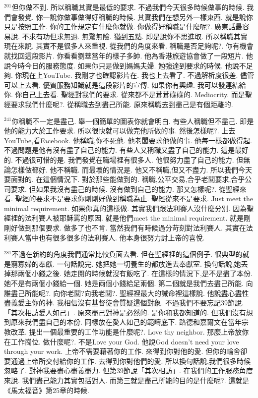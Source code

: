 \documentclass{book}
\begin{document}
$^{201}$但你做不到.
所以稱職其實是最低的要求.
不過我們今天很多時候做事的時候.
我們會發覺.
你一說你做事做得好稱職的時候.
其實我們在想另外一樣東西.
就是說你只是按照工作.
你的工作規定有什麼你就做.
你做得好稱職是什麼呢?.
廣東話最容易說.
不求有功但求無過.
無驚無險.
猶到五點.
即是說你不思進取.
所以稱職其實現在來說.
其實不是很多人來重視.
從我們的角度來看.
稱職是否足夠呢?.
你有機會就找回這段影片.
你看看劉華當年的樣子多帥.
他為香港旅遊協會做了一段短片.
他說今時今日的服務態度.
如果你只是做到媽媽夫婦.
勉強達到要求的時候.
他說不足夠.
你現在上YouTube.
我剛才也確認影片在.
我也上去看了.
不過解析度很差.
儘管可以上去看.
優質服務知識就是這段影片的宣傳.
如果你有興趣.
我可以發連結給你.
你自己上去看.
聖經對我們的要求.
從來都不是茸茸碌碌的.
Mediocrity.
而是聖經要求我們什麼呢?.
從稱職去到盡己所能.
原來稱職去到盡己是有個距離的.

$^{241}$你稱職不一定是盡己.
舉一個簡單的圖表你就會明白.
有些人稱職但不盡己.
即是他的能力大於工作要求.
所以很快就可以做完他所做的事.
然後怎樣呢?.
上去YouTube,看Facebook.
他稱職,你不死他.
他老闆要求他做的事.
他每一樣都做得起.
不過問題是他有沒有盡了自己的能力.
有些人又稱職又盡了自己的能力.
這是最好的.
不過很可惜的是.
我們發覺在職場裡有很多人.
他很努力盡了自己的能力.
但無論怎樣做都好.
他不稱職.
而最壞的情況是.
他又不稱職,但又不盡力.
所以我們今天要面對的.
在這個情況下.
對於那些能做到的.
稱職,公平交易,合乎老闆要求,合乎公司要求.
但如果我沒有盡己的時候.
沒有做到自己的能力.
那又怎樣呢?.
從聖經來看.
聖經的要求不是要求你剛剛好做到稱職為止.
聖經從來不是要求.
Just meet the minimal requirement.
如果你真的這樣做.
其實我們跟法利賽人沒什麼分別.
因為聖經裡的法利賽人被耶穌罵的原因.
就是他們meet the minimal requirement.
就是剛剛好做到那個要求.
做多了也不肯.
當然我們有時候過分苛刻對法利賽人.
其實在法利賽人當中也有很多很多的法利賽人.
他本身很努力討上帝的喜悅.

$^{281}$不過在新約的角度我們通常比較負面去看.
但在聖經裡的這個例子.
很典型的就是窮寡婦的奉獻.
一句話說完.
她把她一切養生的都放進去奉獻室.
換句話說,她丟掉那兩個小錢之後.
她走開的時候就沒有飯吃了.
在這樣的情況下,是不是盡了本份.
她不是有兩個小錢給一個.
她是兩個小錢給足兩個.
第二個就是我們去盡己所能.
向誰盡己所能呢?.
向你老闆?向我老闆?.
聖經裡最大的誡命裡這樣說.
他說盡心盡性盡義愛主你的神.
我相信沒有基督徒會質疑這個對象.
不過我們不要忘記39節說.
「其次相訪愛人如己」.
原來盡己對神是必然的.
是你和我都知道的.
但我們沒有想到原來我們盡自己的本份.
同樣放在愛人如己的範疇底下.
路德和嘉爾文在當年宗教改革.
提出一個最重要的工作功能是什麼呢?.
Love thy neighbor.
那麼上帝放你在工作崗位.
做什麼呢?.
不是Love your God.
他說God doesn't need your love through your work.
上帝不需要藉著你的工作.
來得到你對他的愛.
但你的輪舍卻要通過上帝所交付給你的工作.
去得到你對他們的愛.
所以換句話說,我們很多時候忽略了.
對神我要盡心盡義盡力.
但第39節說「其次相訪」.
在我們的工作服務角度來說.
我們盡己能力其實包括對人.
而第三就是盡己所能的目的是什麼呢?.
這就是《馬太福音》第25章的時候.
\end{document}
